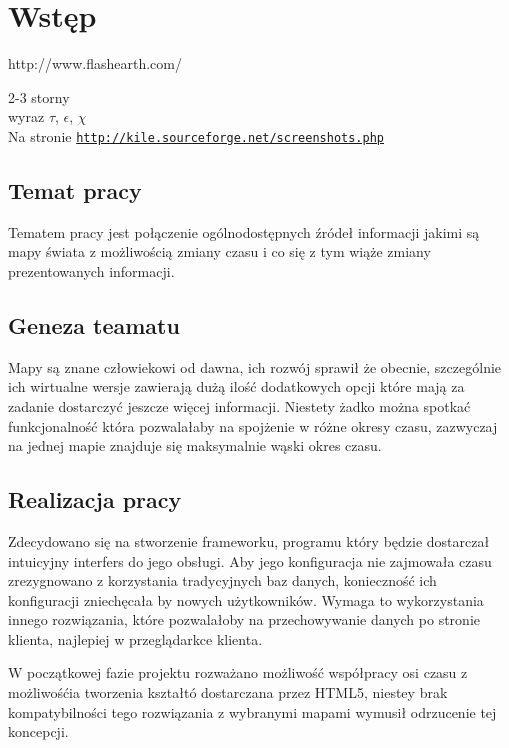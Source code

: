 \chapter{Wstęp}
\label{cha:wstep}

\nocite{gisSystems}
\nocite{webgis}
\nocite{imprxml}
\nocite{perfxml}
http://www.flashearth.com/

2-3 storny\\
wyraz $\tau$, $\epsilon$, $\chi$\\
Na stronie \underline{\texttt{http://kile.sourceforge.net/screenshots.php}}\\

\section{Temat pracy}
\label{sec:tematPracy}

Tematem pracy jest połączenie ogólnodostępnych źródeł informacji jakimi są mapy świata z możliwością zmiany czasu i co się z tym wiąże zmiany prezentowanych informacji.

\section{Geneza teamatu}
\label{sec:geneza}

Mapy są znane człowiekowi od dawna, ich rozwój sprawił że obecnie, szczególnie ich wirtualne wersje zawierają dużą ilość dodatkowych opcji które mają za zadanie dostarczyć jeszcze więcej informacji. Niestety żadko można spotkać funkcjonalność która pozwalałaby na spojżenie w różne okresy czasu, zazwyczaj na jednej mapie znajduje się maksymalnie wąski okres czasu.

\section{Realizacja pracy}
\label{sec:realizacja}

Zdecydowano się na stworzenie frameworku, programu który będzie dostarczał intuicyjny interfers do jego obsługi. Aby jego konfiguracja nie zajmowała czasu zrezygnowano z korzystania tradycyjnych baz danych, konieczność ich konfiguracji zniechęcała by nowych użytkowników. Wymaga to wykorzystania innego rozwiązania, które pozwalałoby na przechowywanie danych po stronie klienta, najlepiej w przeglądarkce klienta.

W początkowej fazie projektu rozważano możliwość współpracy osi czasu z możliwośćia tworzenia kształtó dostarczana przez HTML5, niestey brak kompatybilności tego rozwiązania z wybranymi mapami wymusił odrzucenie tej koncepcji.

